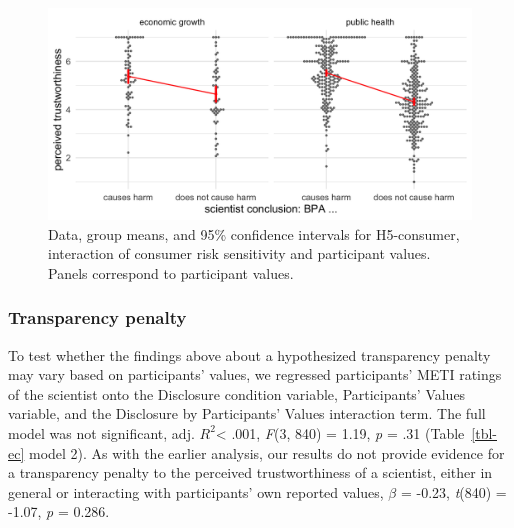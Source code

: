 \documentclass[
  letterpaper,
  DIV=11,
  numbers=noendperiod]{scrartcl}
\begin{document}
\begin{figure}

{\centering \includegraphics{fig4_conclusion_part.png}

}

\caption{\label{fig-conclusion-part}Data, group means, and 95\%
confidence intervals for H5-consumer, interaction of consumer risk
sensitivity and participant values. Panels correspond to participant
values.}

\end{figure}

\hypertarget{transparency-penalty}{%
\subsubsection{Transparency penalty}\label{transparency-penalty}}

To test whether the findings above about a hypothesized transparency
penalty may vary based on participants' values, we regressed
participants' METI ratings of the scientist onto the Disclosure
condition variable, Participants' Values variable, and the Disclosure by
Participants' Values interaction term. The full model was not
significant, adj. \(R^2\)\textless{} .001, \emph{F}(3, 840) = 1.19,
\emph{p} = .31 (Table~\ref{tbl-ec} model 2). As with the earlier
analysis, our results do not provide evidence for a transparency penalty
to the perceived trustworthiness of a scientist, either in general or
interacting with participants' own reported values, \(\beta\) = -0.23,
\emph{t}(840) = -1.07, \emph{p} = 0.286.
\end{document}

